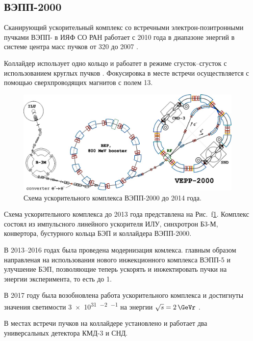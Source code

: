 \subsection{ВЭПП-2000}

Сканирующий ускорительный комплекс со встречными элек\-т\-рон-по\-зи\-т\-рон\-ны\-ми пучками ВЭПП-
в ИЯФ СО РАН работает с 2010 года в диапазоне энергий в системе центра масс пучков от \SI{320}{\MeVr} до \SI{2007}{\MeVr} \cite{Berkaev2012}.

Коллайдер использует одно кольцо и рабоатет в режиме сгусток--сгусток
с использованием круглых пучков \cite{Danilov:1996jw}.
Фокусировка в месте встречи осуществляется с помощью сверхпроводящих магнитов с полем \SI{13}{\teslaru}.

\begin{figure}[htbp]
    \centering
    \includegraphics[width=\textwidth]{img/vepp2knew.png}
    \caption{Схема ускорительного комплекса ВЭПП-2000 до 2014 года.}
    \label{fig:vepp2000}
\end{figure}

Схема ускорительного комплекса до 2013 года представлена на Рис.~f\ref{fig:vepp2000}.
Комплекс состоял из импульсного линейного ускорителя ИЛУ,
синхротрон Б3-М,
конвертора,
бустурного кольца БЭП
и коллайдера ВЭПП-2000.

В 2013--2016 годах была проведена модернизация комлекса.
главным образом направленая на использования нового инжекционного комплекса ВЭПП-5
и улучшение БЭП,
позволяющие теперь ускорять и инжектировать пучки на энергии эксперимента,
то есть до \SI{1}{\GeVr}.

В 2017 году была возобновлена работа ускорительного комплекса и достигнуты значения светимости
\SI{3e31}{\cmr^{-2} \sr^{-1}} на энергии $\sqrt{s} = \SI{2}{\GeVr}$ \cite{Shatunov:2018xfm}.

В местах встречи пучков на коллайдере установлено и работает два универсальных детектора КМД-3 и СНД.



